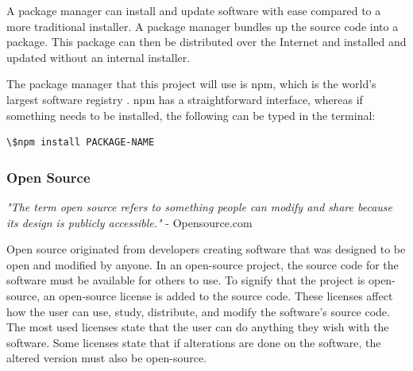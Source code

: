 A package manager can install and update software with ease compared to a more traditional installer. A package manager bundles up the source code into a package. This package can then be distributed over the Internet and installed and updated without an internal installer. 

The package manager that this project will use is \acrfull{npm}, which is the world's largest software registry \cite{NpmNpmDocs}.
\acrshort{npm} has a straightforward interface, whereas if something needs to be installed, the following can be typed in the terminal: 

\begin{lstlisting}[style=htmlcssjs]
\$npm install PACKAGE-NAME
\end{lstlisting}

\subsubsection{Open Source}%
\label{ssub:Open Source}

\textit{"The term open source refers to something people can modify and share because its design is publicly accessible."} - Opensource.com \cite{WhatOpenSource}

Open source originated from developers creating software that was designed to be open and modified by anyone. In an open-source project, the source code for the software must be available for others to use. To signify that the project is open-source, an open-source license is added to the source code. These licenses affect how the user can use, study, distribute, and modify the software's source code. The most used licenses state that the user can do anything they wish with the software. Some licenses state that if alterations are done on the software, the altered version must also be open-source. 







